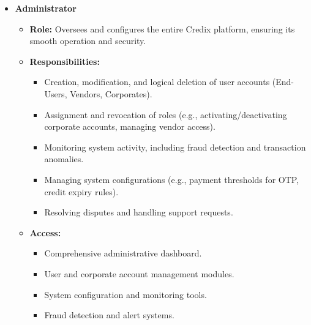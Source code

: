 \begin{itemize}
    \item \textbf{Administrator}
    \begin{itemize}
        \item \textbf{Role:} Oversees and configures the entire Credix platform, ensuring its smooth operation and security.
        \item \textbf{Responsibilities:}
        \begin{itemize}
            \item Creation, modification, and logical deletion of user accounts (End-Users, Vendors, Corporates).
            \item Assignment and revocation of roles (e.g., activating/deactivating corporate accounts, managing vendor access).
            \item Monitoring system activity, including fraud detection and transaction anomalies.
            \item Managing system configurations (e.g., payment thresholds for OTP, credit expiry rules).
            \item Resolving disputes and handling support requests.
        \end{itemize}
        \item \textbf{Access:}
        \begin{itemize}
            \item Comprehensive administrative dashboard.
            \item User and corporate account management modules.
            \item System configuration and monitoring tools.
            \item Fraud detection and alert systems.
        \end{itemize}
    \end{itemize}
\end{itemize}